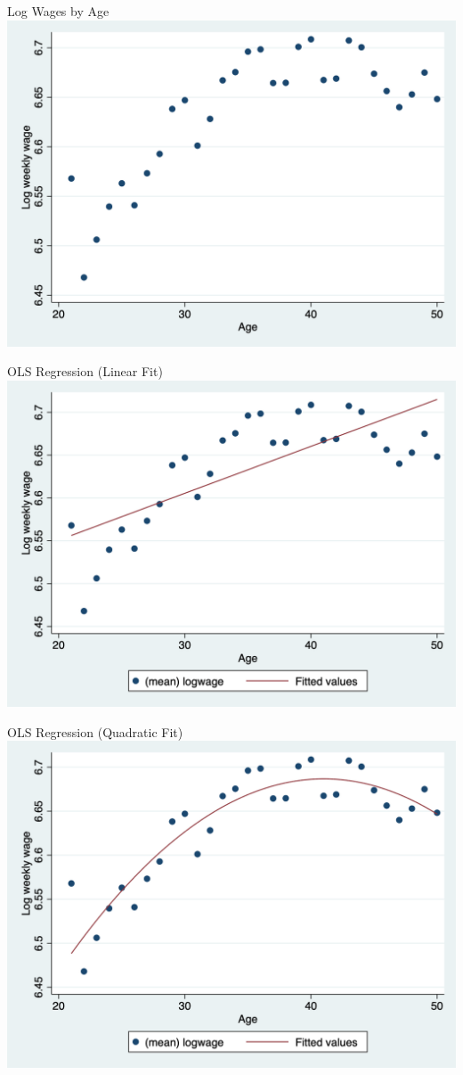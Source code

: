\documentclass[11pt,english,handout]{beamer}
\begin{document}
		
	\begin{frame}{Log Wages by Age}
		\centering
		\includegraphics[width = 0.8 \linewidth]{logwages}
		
	\end{frame}
	
	\begin{frame}{OLS Regression (Linear Fit)}
		\centering
		\includegraphics[width = 0.8 \linewidth]{logwages-linear}
		
	\end{frame}
	
		\begin{frame}{OLS Regression (Quadratic Fit)}
		\centering
		\includegraphics[width = 0.8 \linewidth]{logwages-quadratic}
		
	\end{frame}
\end{document}
